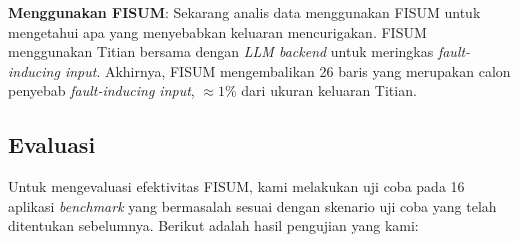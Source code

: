 \textbf{Menggunakan FISUM}: Sekarang analis data 
menggunakan FISUM untuk mengetahui apa yang menyebabkan 
keluaran mencurigakan. FISUM menggunakan Titian bersama 
dengan \emph{LLM backend} untuk meringkas 
\emph{fault-inducing input}. Akhirnya, FISUM mengembalikan 
26 baris yang merupakan calon penyebab 
\emph{fault-inducing input}, $\approx 1\%$ dari ukuran 
keluaran Titian.

\subsection{Evaluasi}
\label{subsec:evaluasi}

Untuk mengevaluasi efektivitas FISUM, kami melakukan uji
coba pada 16 aplikasi \emph{benchmark} yang bermasalah
sesuai dengan skenario uji coba yang telah ditentukan
sebelumnya. Berikut adalah hasil pengujian yang kami:

